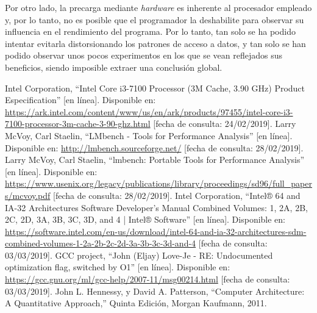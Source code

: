 \documentclass[conference]{IEEEtran}
\begin{document}
Por otro lado, la precarga mediante \textit{hardware} es inherente al procesador empleado y, por lo tanto, no es posible que el programador la deshabilite para observar su influencia en el rendimiento del programa. Por lo tanto, tan solo se ha podido intentar evitarla distorsionando los patrones de acceso a datos, y tan solo se han podido observar unos pocos experimentos en los que se vean reflejados sus beneficios, siendo imposible extraer una conclusión global.

\begin{thebibliography}{00}
 Intel Corporation, ``Intel Core i3-7100 Processor (3M Cache, 3.90 GHz) Product Especification'' [en línea]. Disponible en: \url{https://ark.intel.com/content/www/us/en/ark/products/97455/intel-core-i3-7100-processor-3m-cache-3-90-ghz.html} [fecha de consulta: 24/02/2019].
 Larry McVoy, Carl Staelin, ``LMbench - Tools for Performance Analysis'' [en línea]. Disponible en: \url{http://lmbench.sourceforge.net/} [fecha de consulta: 28/02/2019].
 Larry McVoy, Carl Staelin, ``lmbench: Portable Tools for Performance Analysis'' [en línea]. Disponible en: \url{https://www.usenix.org/legacy/publications/library/proceedings/sd96/full_papers/mcvoy.pdf} [fecha de consulta: 28/02/2019].
 Intel Corporation, ``Intel® 64 and IA-32 Architectures Software Developer’s Manual Combined Volumes: 1, 2A, 2B, 2C, 2D, 3A, 3B, 3C, 3D, and 4 | Intel® Software'' [en línea]. Disponible en: \url{https://software.intel.com/en-us/download/intel-64-and-ia-32-architectures-sdm-combined-volumes-1-2a-2b-2c-2d-3a-3b-3c-3d-and-4} [fecha de consulta: 03/03/2019].
 GCC project, ``John (Eljay) Love-Je - RE: Undocumented optimization flag, switched by O1'' [en línea]. Disponible en: \url{https://gcc.gnu.org/ml/gcc-help/2007-11/msg00214.html} [fecha de consulta: 03/03/2019].
 John L. Hennessy, y David A. Patterson, ``Computer Architecture: A Quantitative Approach,'' Quinta Edición, Morgan Kaufmann, 2011.
\end{thebibliography}
\end{document}
